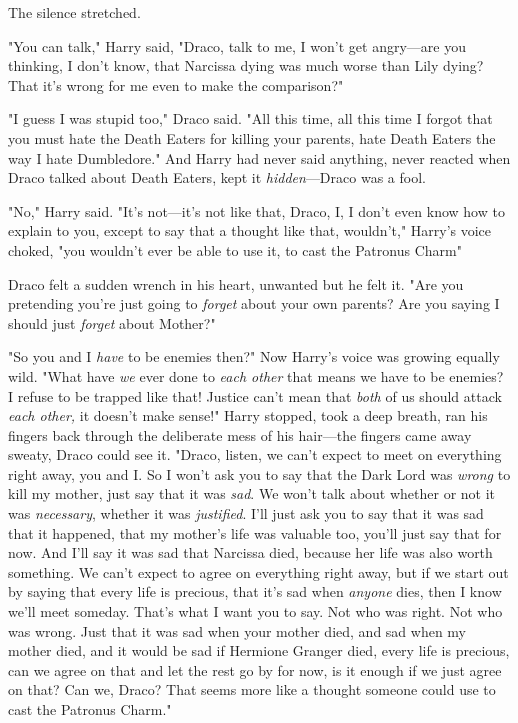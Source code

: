 The silence stretched.

"You can talk," Harry said, "Draco, talk to me, I won't get angry---are you
thinking, I don't know, that Narcissa dying was much worse than Lily dying?
That it's wrong for me even to make the comparison?"

"I guess I was stupid too," Draco said. "All this time, all this time I forgot
that you must hate the Death Eaters for killing your parents, hate Death Eaters
the way I hate Dumbledore." And Harry had never said anything, never reacted
when Draco talked about Death Eaters, kept it \emph{hidden}---Draco was a fool.

"No," Harry said. "It's not---it's not like that, Draco, I, I don't even know
how to explain to you, except to say that a thought like that, wouldn't,"
Harry's voice choked, "you wouldn't ever be able to use it, to cast the
Patronus Charm{\el}"

Draco felt a sudden wrench in his heart, unwanted but he felt it. "Are you
pretending you're just going to \emph{forget} about your own parents? Are you
saying I should just \emph{forget} about Mother?"

"So you and I \emph{have} to be enemies then?" Now Harry's voice was growing
equally wild. "What have \emph{we} ever done to \emph{each other} that means we
have to be enemies? I refuse to be trapped like that! Justice can't mean that
\emph{both} of us should attack \emph{each other,} it doesn't make sense!"
Harry stopped, took a deep breath, ran his fingers back through the deliberate
mess of his hair---the fingers came away sweaty, Draco could see it. "Draco,
listen, we can't expect to meet on everything right away, you and I. So I won't
ask you to say that the Dark Lord was \emph{wrong} to kill my mother, just say
that it was{\el} \emph{sad}. We won't talk about whether or not it was
\emph{necessary}, whether it was \emph{justified}. I'll just ask you to say
that it was sad that it happened, that my mother's life was valuable too,
you'll just say that for now. And I'll say it was sad that Narcissa died,
because her life was also worth something. We can't expect to agree on
everything right away, but if we start out by saying that every life is
precious, that it's sad when \emph{anyone} dies, then I know we'll meet
someday. That's what I want you to say. Not who was right. Not who was wrong.
Just that it was sad when your mother died, and sad when my mother died, and it
would be sad if Hermione Granger died, every life is precious, can we agree on
that and let the rest go by for now, is it enough if we just agree on that? Can
we, Draco? That seems{\el} more like a thought someone could use to cast the
Patronus Charm."

